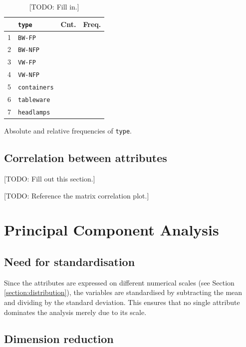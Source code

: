 \documentclass[dtu]{dtuarticle}
\newcommand{\todo}[1]{\color{red}[TODO: #1]\color{black}}
\begin{document}
\begin{table}[h!]
\begin{subtable}{.3\textwidth}
			\begin{tabular}{r|l|l|l}
				& \texttt{type}       & \textbf{Cnt.} & \textbf{Freq.} \\ \hline\hline
				1 & \texttt{BW-FP}      &                &                \\ \hline
				2 & \texttt{BW-NFP}     &                &                \\ \hline
				3 & \texttt{VW-FP}      &                &                \\ \hline
				4 & \texttt{VW-NFP}     &                &                \\ \hline
				5 & \texttt{containers} &                &                \\ \hline
				6 & \texttt{tableware}  &                &                \\ \hline
				7 & \texttt{headlamps}  &                &
			\end{tabular}
			\caption{Absolute and relative frequencies of \texttt{type}.}
			\label{table:frequencies}
		\end{subtable}
		\caption{\todo{Fill in.}}
	\end{table}

	\subsection{Correlation between attributes}

	\todo{Fill out this section.}

	\todo{Reference the matrix correlation plot.}

	\section{Principal Component Analysis}

	\subsection{Need for standardisation}

	Since the attributes are expressed on different numerical scales (see Section \ref{section:distribution}), the variables are standardised by subtracting the mean and dividing by the standard deviation. This ensures that no single attribute dominates the analysis merely due to its scale.

	\subsection{Dimension reduction}
\end{document}
